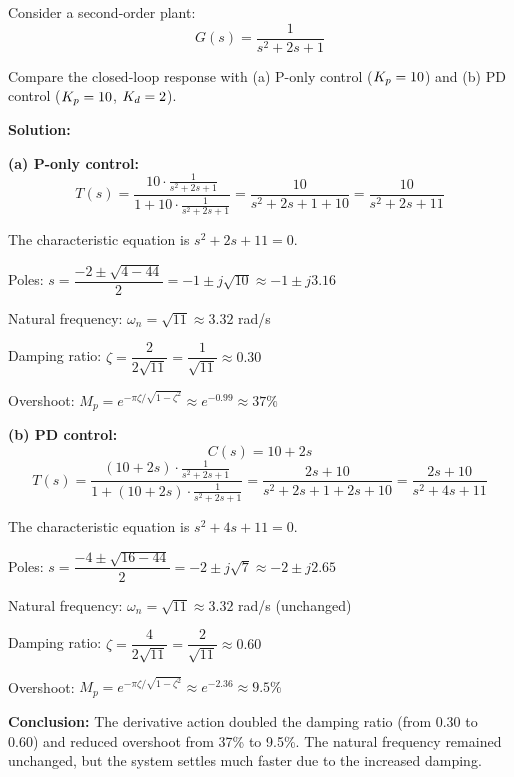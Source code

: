 \begin{example}
\label{ex:derivative_damping}
Consider a second-order plant:
\begin{equation*}
G(s) = \frac{1}{s^2 + 2s + 1}
\end{equation*}

Compare the closed-loop response with (a) P-only control ($K_p = 10$) and (b) PD control ($K_p = 10$, $K_d = 2$).

\textbf{Solution:}

\textbf{(a) P-only control:}
\begin{equation*}
T(s) = \frac{10 \cdot \frac{1}{s^2 + 2s + 1}}{1 + 10 \cdot \frac{1}{s^2 + 2s + 1}} = \frac{10}{s^2 + 2s + 1 + 10} = \frac{10}{s^2 + 2s + 11}
\end{equation*}

The characteristic equation is $s^2 + 2s + 11 = 0$.

Poles: $s = \dfrac{-2 \pm \sqrt{4 - 44}}{2} = -1 \pm j\sqrt{10} \approx -1 \pm j3.16$

Natural frequency: $\omega_n = \sqrt{11} \approx 3.32$ rad/s

Damping ratio: $\zeta = \dfrac{2}{2\sqrt{11}} = \dfrac{1}{\sqrt{11}} \approx 0.30$

Overshoot: $M_p = e^{-\pi\zeta/\sqrt{1-\zeta^2}} \approx e^{-0.99} \approx 37\%$

\textbf{(b) PD control:}
\begin{equation*}
C(s) = 10 + 2s
\end{equation*}
\begin{equation*}
T(s) = \frac{(10 + 2s) \cdot \frac{1}{s^2 + 2s + 1}}{1 + (10 + 2s) \cdot \frac{1}{s^2 + 2s + 1}} = \frac{2s + 10}{s^2 + 2s + 1 + 2s + 10} = \frac{2s + 10}{s^2 + 4s + 11}
\end{equation*}

The characteristic equation is $s^2 + 4s + 11 = 0$.

Poles: $s = \dfrac{-4 \pm \sqrt{16 - 44}}{2} = -2 \pm j\sqrt{7} \approx -2 \pm j2.65$

Natural frequency: $\omega_n = \sqrt{11} \approx 3.32$ rad/s (unchanged)

Damping ratio: $\zeta = \dfrac{4}{2\sqrt{11}} = \dfrac{2}{\sqrt{11}} \approx 0.60$

Overshoot: $M_p = e^{-\pi\zeta/\sqrt{1-\zeta^2}} \approx e^{-2.36} \approx 9.5\%$

\textbf{Conclusion:} The derivative action doubled the damping ratio (from 0.30 to 0.60) and reduced overshoot from 37\% to 9.5\%. The natural frequency remained unchanged, but the system settles much faster due to the increased damping.
\end{example}

